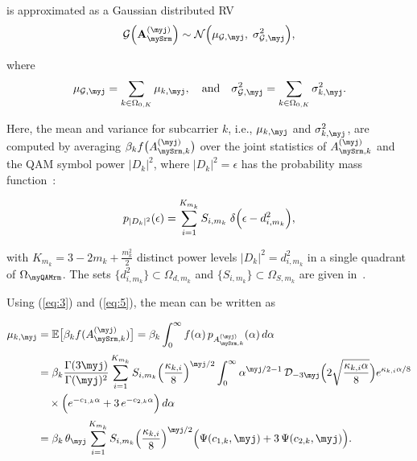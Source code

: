 \begin{minipage}[t][12cm]{\columnwidth}

is approximated as a Gaussian distributed RV
\begin{equation*}
\mathcal{G}\Bigl(\mathbf{A}^{(\myj)}_{\mySrm}\Bigr) \sim 
\mathcal{N}\Bigl( \mu_{\mathcal{G},\myj}, \; \sigma^2_{\mathcal{G},\myj} \Bigr),
\end{equation*}

\noindent
where
\begin{equation*}
\mu_{\mathcal{G},\myj} = \sum_{k \in \Omega_{0,K}} \mu_{k,\myj}, 
\quad \text{and} \quad
\sigma^2_{\mathcal{G},\myj} = \sum_{k \in \Omega_{0,K}} \sigma^2_{k,\myj}.
\end{equation*}

Here, the mean and variance for subcarrier $k$, i.e., $\mu_{k,\myj}$ and $\sigma^2_{k,\myj}$, 
are computed by averaging 
$\beta_k f\bigl(A^{(\myj)}_{\mySrm,k}\bigr)$ 
over the joint statistics of $A^{(\myj)}_{\mySrm,k}$ and the QAM symbol power $|D_k|^2$, 
where $|D_k|^2 = \epsilon$ has the probability mass function~\cite{Mansour2018_alt}:

\begin{equation}
p_{|D_k|^2}(\epsilon)
=
\sum_{i=1}^{K_{m_k}} S_{i,m_k} \;
\delta\Bigl(\epsilon - d^2_{i,m_k} \Bigr),
\label{eq:5}
\end{equation}

with 
$K_{m_k} = 3 - 2 m_k + \frac{m_k^2}{2}$ 
distinct power levels $|D_k|^2 = d^2_{i,m_k}$ in a single quadrant of $\Omega_{\myQAMrm}$.  
The sets $\{ d^2_{i,m_k} \} \subset \Omega_{d,m_k}$ 
and $\{ S_{i,m_k} \} \subset \Omega_{S,m_k}$ are given in~\cite{Ding2012_alt}.  

Using (\ref{eq:3}) and (\ref{eq:5}), the mean can be written as

\begin{equation*}
\begin{split}
\mu_{k,\myj} 
&= \mathbb{E}\bigl[ \beta_k f(A^{(\myj)}_{\mySrm,k}) \bigr] 
= \beta_k \int_0^{\infty} f(\alpha) \, p_{A^{(\myj)}_{\mySrm,k}}(\alpha) \, d\alpha \\[0.2em]
&= \beta_k \frac{\Gamma(3\myj)}{\Gamma(\myj)^2} 
  \sum_{i=1}^{K_{m_k}} S_{i,m_k} 
  \Bigl( \frac{\kappa_{k,i}}{8} \Bigr)^{\myj/2} 
  \int_0^{\infty} 
    \alpha^{\myj/2-1} \,
    \mathcal{D}_{-3\myj}\Bigl( 2 \sqrt{\frac{\kappa_{k,i} \alpha}{8}} \Bigr) 
    e^{\kappa_{k,i}\alpha/8} \\ 
&\quad \times \Bigl( e^{-c_{1,k} \alpha} + 3 \, e^{-c_{2,k} \alpha} \Bigr) 
\, d\alpha \\[0.2em]
&= \beta_k \, \theta_{\myj} 
  \sum_{i=1}^{K_{m_k}} S_{i,m_k} 
  \Bigl( \frac{\kappa_{k,i}}{8} \Bigr)^{\myj/2} 
  \Bigl( \Psi(c_{1,k},\myj) + 3 \, \Psi(c_{2,k},\myj) \Bigr).
\end{split}
\end{equation*}


\end{minipage}
